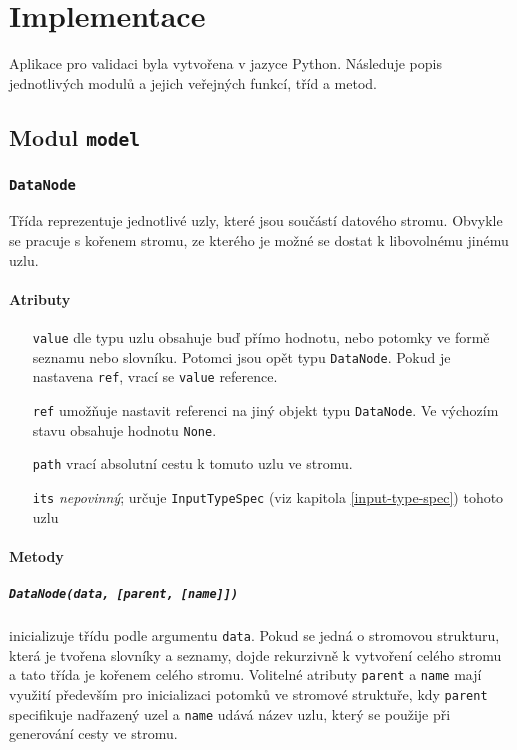\documentclass[FM,MP]{tulthesis}
\begin{document}
\chapter{Implementace}
	\label{implementace}
	Aplikace pro validaci byla vytvořena v jazyce Python. Následuje popis jednotlivých modulů a jejich veřejných funkcí, tříd a metod.

	\section{Modul \texttt{model}}

		\subsection*{\texttt{DataNode}}
			Třída reprezentuje jednotlivé uzly, které jsou součástí datového stromu. Obvykle se pracuje s kořenem stromu, ze kterého je možné se dostat k libovolnému jinému uzlu.

			\subsubsection{Atributy}
				\begin{itemize}[leftmargin=2cm]
					\setlength\itemsep{-2mm}
					\item[\texttt{value}] dle typu uzlu obsahuje buď přímo hodnotu, nebo potomky ve formě seznamu nebo slovníku. Potomci jsou opět typu \texttt{DataNode}. Pokud je nastavena \texttt{ref}, vrací se \texttt{value} reference.
					\item[\texttt{ref}] umožňuje nastavit referenci na jiný objekt typu \texttt{DataNode}. Ve výchozím stavu obsahuje hodnotu \texttt{None}.
					\item[\texttt{path}] vrací absolutní cestu k tomuto uzlu ve stromu.
					\item[\texttt{its}] \textit{nepovinný}; určuje \texttt{InputTypeSpec} (viz kapitola \ref{input-type-spec}) tohoto uzlu
				\end{itemize}
			
			\subsubsection{Metody}
				\paragraph{\texttt{DataNode(data, [parent, [name]])}}
					inicializuje třídu podle argumentu \texttt{data}. Pokud se jedná o stromovou strukturu, která je tvořena slovníky a seznamy, dojde rekurzivně k vytvoření celého stromu a tato třída je kořenem celého stromu. Volitelné atributy \texttt{parent} a \texttt{name} mají využití především pro inicializaci potomků ve stromové struktuře, kdy \texttt{parent} specifikuje nadřazený uzel a \texttt{name} udává název uzlu, který se použije při generování cesty ve stromu.
\end{document}
